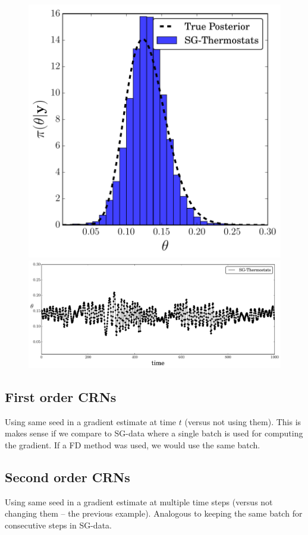 \documentclass[]{article}
\begin{document}
\begin{figure}[t]
\begin{center}
\includegraphics[width=0.5\columnwidth]{./images/exp-SG-Thermostats-posterior_hist.pdf}
\includegraphics[width=1.2\columnwidth]{./images/exp-SG-Thermostats-theta-timeseries.pdf}
\caption{\small{}}
\label{fig:exp-posteriors}
\end{center}
\vskip -0.2in
\end{figure} 

\subsection{First order CRNs}
Using same seed in a gradient estimate at time $t$ (versus not using them).  This is makes sense if we compare to SG-data where a single batch is used for computing the gradient.  If a FD method was used, we would use the same batch.

\subsection{Second order CRNs}
Using same seed in a gradient estimate at multiple time steps (versus not changing them -- the previous example).  Analogous to keeping the same batch for consecutive steps in SG-data.
\end{document}
